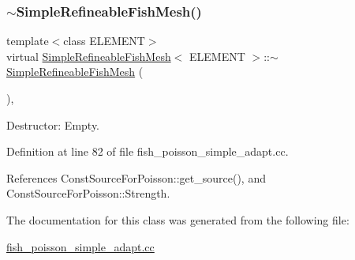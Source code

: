 \subsubsection{\texorpdfstring{$\sim$\+Simple\+Refineable\+Fish\+Mesh()}{~SimpleRefineableFishMesh()}}
{\footnotesize\ttfamily template$<$class E\+L\+E\+M\+E\+NT$>$ \\
virtual \hyperlink{classSimpleRefineableFishMesh}{Simple\+Refineable\+Fish\+Mesh}$<$ E\+L\+E\+M\+E\+NT $>$\+::$\sim$\hyperlink{classSimpleRefineableFishMesh}{Simple\+Refineable\+Fish\+Mesh} (\begin{DoxyParamCaption}{ }\end{DoxyParamCaption})\hspace{0.3cm}{\ttfamily [inline]}, {\ttfamily [virtual]}}



Destructor\+: Empty. 



Definition at line 82 of file fish\+\_\+poisson\+\_\+simple\+\_\+adapt.\+cc.



References Const\+Source\+For\+Poisson\+::get\+\_\+source(), and Const\+Source\+For\+Poisson\+::\+Strength.



The documentation for this class was generated from the following file\+:\begin{DoxyCompactItemize}
\item 
\hyperlink{fish__poisson__simple__adapt_8cc}{fish\+\_\+poisson\+\_\+simple\+\_\+adapt.\+cc}\end{DoxyCompactItemize}
